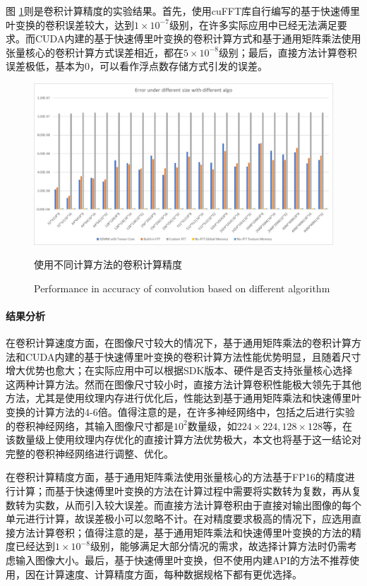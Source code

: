 \par 图 \ref{Fig.CONVPr}则是卷积计算精度的实验结果。首先，使用cuFFT库自行编写的基于快速傅里叶变换的卷积误差较大，达到$ 1\times 10^{-7} $级别，在许多实际应用中已经无法满足要求。而CUDA内建的基于快速傅里叶变换的卷积计算方式和基于通用矩阵乘法使用张量核心的卷积计算方式误差相近，都在$ 5\times 10^{-8} $级别；最后，直接方法计算卷积误差极低，基本为0，可以看作浮点数存储方式引发的误差。
\begin{figure}
	\centering
	\includegraphics[width=15cm]{figures/CONVError.jpg}
	\renewcommand{\thefigure}{\arabic{section}-\arabic{figure} }
	\renewcommand{\figurename}{图}
	\caption{使用不同计算方法的卷积计算精度}
	\addtocounter{figure}{-1}
	\renewcommand{\thefigure}{\arabic{section}-\arabic{figure} }
	\renewcommand{\figurename}{Figure}
	\caption{Performance in accuracy of convolution based on different algorithm}
	\label{Fig.CONVPr}
\end{figure}
\paragraph{结果分析}
\par 在卷积计算速度方面，在图像尺寸较大的情况下，基于通用矩阵乘法的卷积计算方法和CUDA内建的基于快速傅里叶变换的卷积计算方法性能优势明显，且随着尺寸增大优势也愈大；在实际应用中可以根据SDK版本、硬件是否支持张量核心选择这两种计算方法。然而在图像尺寸较小时，直接方法计算卷积性能极大领先于其他方法，尤其是使用纹理内存进行优化后，性能达到基于通用矩阵乘法和快速傅里叶变换的计算方法的4-6倍。值得注意的是，在许多神经网络中，包括之后进行实验的卷积神经网络，其输入图像尺寸都是$ 10^2 $数量级，如$ 224\times 224, 128\times 128 $等，在该数量级上使用纹理内存优化的直接计算方法优势极大，本文也将基于这一结论对完整的卷积神经网络进行调整、优化。
\par 在卷积计算精度方面，基于通用矩阵乘法使用张量核心的方法基于FP16的精度进行计算；而基于快速傅里叶变换的方法在计算过程中需要将实数转为复数，再从复数转为实数，从而引入较大误差。而直接方法计算卷积由于直接对输出图像的每个单元进行计算，故误差极小可以忽略不计。在对精度要求极高的情况下，应选用直接方法计算卷积；值得注意的是，基于通用矩阵乘法和快速傅里叶变换的方法的精度已经达到$ 1\times 10^{-8} $级别，能够满足大部分情况的需求，故选择计算方法时仍需考虑输入图像大小。最后，基于快速傅里叶变换，但不使用内建API的方法不推荐使用，因在计算速度、计算精度方面，每种数据规格下都有更优选择。
